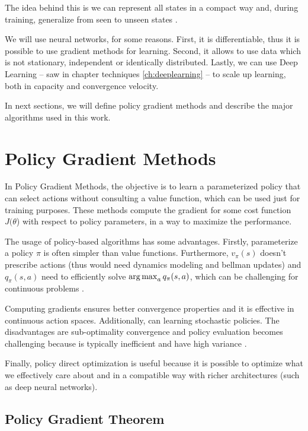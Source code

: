 The idea behind this is we can represent all states in a compact way and, during training, generalize from seen to unseen states \cite{davidsilverlec6}. 

We will use neural networks, for some reasons. First, it is differentiable, thus it is possible to use gradient methods for learning. Second, it allows to use data which is not stationary, independent or identically distributed. Lastly, we can use Deep Learning -- saw in chapter techniques \ref{ch:deeplearning} -- to scale up learning, both in capacity and convergence velocity.

In next sections, we will define policy gradient methods and describe the major algorithms used in this work.


\section{Policy Gradient Methods}\label{sec:pgmethods}

In Policy Gradient Methods, the objective is to learn a parameterized policy that can select actions without consulting a value function, which can be used just for training purposes. These methods compute the gradient for some cost function $J(\theta$) with respect to policy parameters, in a way to maximize the performance.

The usage of policy-based algorithms has some advantages. Firstly, parameterize a policy $\pi$ is often simpler than value functions. Furthermore, $v_{\pi}(s)$ doesn't prescribe actions (thus would need dynamics modeling and bellman updates) and $q_{\pi}(s,a)$ need to efficiently solve $\operatorname*{arg\,max}_{a} q_{\pi}(s,a)$, which can be challenging for continuous problems \cite{deeprlbootcamplec4}.

Computing gradients ensures better convergence properties and it is effective in continuous action spaces. Additionally, can learning stochastic policies. The disadvantages are sub-optimality convergence and policy evaluation becomes challenging because is typically inefficient and have high variance \cite{davidsilverlec7}.

Finally, policy direct optimization is useful because it is possible to optimize what we effectively care about and in a compatible way with richer architectures (such as deep neural networks).

\subsection{Policy Gradient Theorem}

